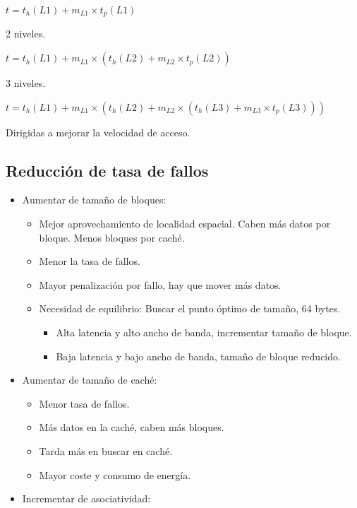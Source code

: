 \documentclass[12pt, twoside, openright]{report} %
\begin{document}
$t = t_h(L1) + m_{L1} \times t_p(L1)$

2 niveles.

$t = t_h(L1) + m_{L1} \times (t_h(L2) + m_{L2} \times t_p(L2))$

3 niveles.

$t = t_h(L1)+m_{L1}\times(t_h(L2) + m_{L2} \times (t_h(L3) + m_{L3} \times t_p(L3)))$

  Dirigidas a mejorar la velocidad de acceso.

  \subsection{Reducción de tasa de fallos}

  \begin{itemize}
  
  \item
    Aumentar de tamaño de bloques:

    \begin{itemize}
    
    \item
      Mejor aprovechamiento de localidad espacial. Caben más datos por
      bloque. Menos bloques por caché.
    \item
      Menor la tasa de fallos.
    \item
      Mayor penalización por fallo, hay que mover más datos.
    \item
      Necesidad de equilibrio: Buscar el punto óptimo de tamaño, 64
      bytes.

      \begin{itemize}
      
      \item
        Alta latencia y alto ancho de banda, incrementar tamaño de
        bloque.
      \item
        Baja latencia y bajo ancho de banda, tamaño de bloque reducido.
      \end{itemize}
    \end{itemize}
  \item
    Aumentar de tamaño de caché:

    \begin{itemize}
    
    \item
      Menor tasa de fallos.
    \item
      Más datos en la caché, caben más bloques.
    \item
      Tarda más en buscar en caché.
    \item
      Mayor coste y consumo de energía.
    \end{itemize}
  \item
    Incrementar de asociatividad:


\end{itemize}
\end{document}
